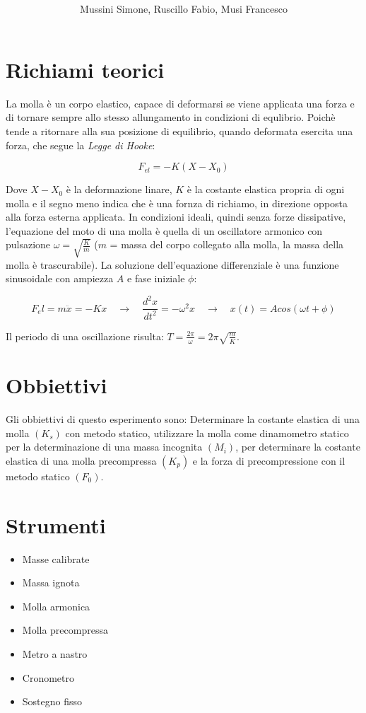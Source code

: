 \documentclass[12pt, a4paper]{article}
\title{\textbf{\scalebox{1.4}{\text{{\Huge Pendolo}}}}}
\date{}
\author{\begin{small}Mussini Simone, Ruscillo Fabio, Musi Francesco\end{small}}
\begin{document}
\maketitle



\section{Richiami teorici}
La molla è un corpo elastico, capace di deformarsi se viene applicata una forza e di tornare sempre allo stesso allungamento in condizioni di equlibrio. 
Poichè tende a ritornare alla sua posizione di equilibrio, quando deformata esercita una forza, che segue la \textit{Legge di Hooke}: 

\begin{equation}
    F_{el} = -K(X-X_0)
\end{equation}

Dove $X-X_0$ è la deformazione linare, $K$ è la costante elastica propria di ogni molla e il segno meno 
indica che è una fornza di richiamo, in direzione opposta alla forza esterna applicata.
In condizioni ideali, quindi senza forze dissipative, l'equazione del moto di una molla è quella di 
un oscillatore armonico con pulsazione $\omega = \sqrt{\frac{K}{m}}$ ($m$ = massa del corpo collegato alla molla, la massa della molla è trascurabile). La soluzione dell'equazione differenziale è una funzione sinusoidale con ampiezza $A$ e fase iniziale $\phi$:

\begin{equation}
    F_el = m\ddot{x} = -Kx   \quad\xrightarrow{}\quad   \frac{d^2x}{dt^2} = -\omega^2x  \quad\xrightarrow{}\quad   x(t) = A cos(\omega t + \phi)
\end{equation}

Il periodo di una oscillazione risulta: $T = \frac{2\pi}{\omega} = 2\pi\sqrt{\frac{m}{K}}$.


\section{Obbiettivi}
Gli obbiettivi di questo esperimento sono: 
Determinare la costante elastica di una molla $(K_s)$ con metodo statico,  utilizzare la molla come dinamometro statico per la determinazione di una massa incognita $(M_i)$, per determinare la costante elastica di una molla precompressa $(K_p)$ e la forza di precompressione con il metodo statico $(F_0)$.


\section{Strumenti}
    \begin{itemize}
        \item Masse calibrate
        \item Massa ignota 
        \item Molla armonica   
        \item Molla precompressa 
        \item Metro a nastro 
        \item Cronometro 
        \item Sostegno fisso 
    \end{itemize}
\end{document}
